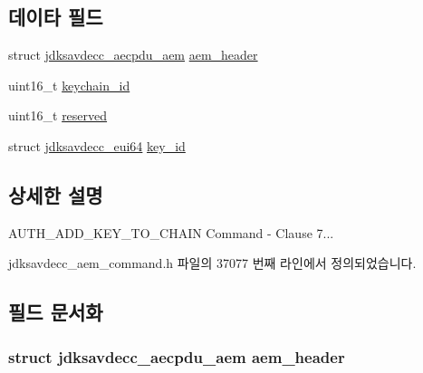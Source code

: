 \subsection*{데이타 필드}
\begin{DoxyCompactItemize}
\item 
struct \hyperlink{structjdksavdecc__aecpdu__aem}{jdksavdecc\+\_\+aecpdu\+\_\+aem} \hyperlink{structjdksavdecc__aem__command__auth__add__key__to__chain_ae1e77ccb75ff5021ad923221eab38294}{aem\+\_\+header}
\item 
uint16\+\_\+t \hyperlink{structjdksavdecc__aem__command__auth__add__key__to__chain_a10ed6547e01665c453e2a40b142f7526}{keychain\+\_\+id}
\item 
uint16\+\_\+t \hyperlink{structjdksavdecc__aem__command__auth__add__key__to__chain_a5a6ed8c04a3db86066924b1a1bf4dad3}{reserved}
\item 
struct \hyperlink{structjdksavdecc__eui64}{jdksavdecc\+\_\+eui64} \hyperlink{structjdksavdecc__aem__command__auth__add__key__to__chain_a37cbdf6056556ccfaee3ab01dc7c3032}{key\+\_\+id}
\end{DoxyCompactItemize}


\subsection{상세한 설명}
A\+U\+T\+H\+\_\+\+A\+D\+D\+\_\+\+K\+E\+Y\+\_\+\+T\+O\+\_\+\+C\+H\+A\+IN Command -\/ Clause 7... 

jdksavdecc\+\_\+aem\+\_\+command.\+h 파일의 37077 번째 라인에서 정의되었습니다.



\subsection{필드 문서화}
\subsubsection[{\texorpdfstring{aem\+\_\+header}{aem_header}}]{\setlength{\rightskip}{0pt plus 5cm}struct {\bf jdksavdecc\+\_\+aecpdu\+\_\+aem} aem\+\_\+header}\hypertarget{structjdksavdecc__aem__command__auth__add__key__to__chain_ae1e77ccb75ff5021ad923221eab38294}{}\label{structjdksavdecc__aem__command__auth__add__key__to__chain_ae1e77ccb75ff5021ad923221eab38294}


